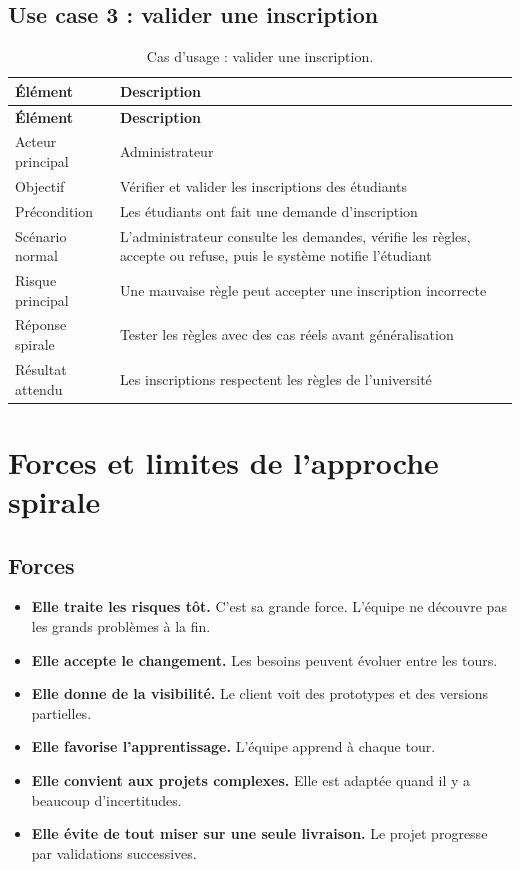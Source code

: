 \documentclass[12pt,a4paper]{article}
\begin{document}
\subsection{Use case 3 : valider une inscription}

\begin{longtable}{p{} p{}}
\caption{Cas d'usage : valider une inscription.}\\
\toprule
\textbf{Élément} & \textbf{Description} \\
\midrule
\endfirsthead
\toprule
\textbf{Élément} & \textbf{Description} \\
\midrule
\endhead
Acteur principal & Administrateur \\
Objectif & Vérifier et valider les inscriptions des étudiants \\
Précondition & Les étudiants ont fait une demande d'inscription \\
Scénario normal & L'administrateur consulte les demandes, vérifie les règles, accepte ou refuse, puis le système notifie l'étudiant \\
Risque principal & Une mauvaise règle peut accepter une inscription incorrecte \\
Réponse spirale & Tester les règles avec des cas réels avant généralisation \\
Résultat attendu & Les inscriptions respectent les règles de l'université \\
\bottomrule
\end{longtable}

\newpage

\section{Forces et limites de l'approche spirale}

\subsection{Forces}

\begin{itemize}
    \item \textbf{Elle traite les risques tôt.} C'est sa grande force. L'équipe ne découvre pas les grands problèmes à la fin.
    \item \textbf{Elle accepte le changement.} Les besoins peuvent évoluer entre les tours.
    \item \textbf{Elle donne de la visibilité.} Le client voit des prototypes et des versions partielles.
    \item \textbf{Elle favorise l'apprentissage.} L'équipe apprend à chaque tour.
    \item \textbf{Elle convient aux projets complexes.} Elle est adaptée quand il y a beaucoup d'incertitudes.
    \item \textbf{Elle évite de tout miser sur une seule livraison.} Le projet progresse par validations successives.
\end{itemize}
\end{document}
